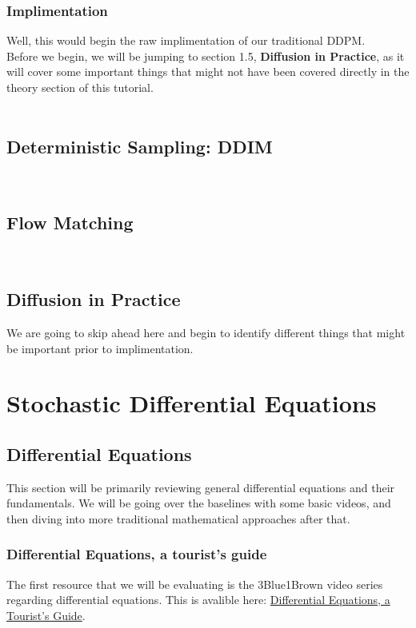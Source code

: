 \documentclass[10pt, oneside]{report}
\begin{document}
\subsection{Implimentation} 
Well, this would begin the raw implimentation of our traditional DDPM.\\
Before we begin, we will be jumping to section 1.5, \textbf{Diffusion in Practice}, as it will cover some important things that might not have been covered directly in the theory section of this tutorial.\\
\\
\section{Deterministic Sampling: DDIM}
\\
\section{Flow Matching}
\\
\section{Diffusion in Practice}
We are going to skip ahead here and begin to identify different things that might be important prior to implimentation.
\\


\chapter{Stochastic Differential Equations}
\section{Differential Equations}
This section will be primarily reviewing general differential equations and their fundamentals.  We will be going over the baselines with some basic videos, and then diving into more traditional mathematical approaches after that.  
\subsection{Differential Equations, a tourist's guide}
The first resource that we will be evaluating is the 3Blue1Brown video series regarding differential equations. This is avalible here: \href{https://www.youtube.com/watch?v=p_di4Zn4wz4&list=PLZHQObOWTQDNPOjrT6KVlfJuKtYTftqH6}{Differential Equations, a Tourist's Guide}.
\end{document}
